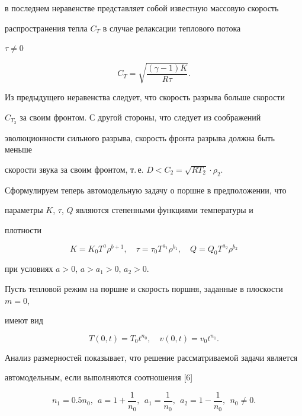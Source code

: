 в последнем неравенстве представляет собой известную массовую скорость


распространения тепла $C_T$ в случае релаксации теплового потока


$\tau\ne0$


$$


C_T=\sqrt{\frac{(\gamma-1)K}{R\tau}}.


$$


Из предыдущего неравенства следует, что скорость разрыва больше скорости


$C_{T_2}$ за своим фронтом. С другой стороны, что следует из соображений


эволюционности сильного разрыва, скорость фронта разрыва должна быть меньше


скорости звука за своим фронтом, т.\,е. $D<C_2=\sqrt{RT_2}\cdot\rho_2$.





Сформулируем теперь автомодельную задачу о поршне в предположении, что


параметры $K$, $\tau$, $Q$ являются степенными функциями температуры и


плотности


$$


K=K_0T^a\rho^{b+1},\quad


\tau=\tau_0T^{a_1}\rho^{b_1},\quad Q=Q_0T^{a_2}\rho^{b_2}


$$


при условиях $a>0$, $a>a_1>0$, $a_2>0$.





Пусть тепловой режим на поршне и скорость поршня, заданные в плоскости $m=0$,


имеют вид


\begin{equation}\label{eq32}


T(0,t)=T_0t^{n_0},\quad v(0,t)=v_0t^{n_1}.


\end{equation}


Анализ размерностей показывает, что решение рассматриваемой задачи является


автомодельным, если выполняются соотношения [6]


\begin{equation}\label{eq33}


n_1=0.5n_0,\ \ a=1+\frac{1}{n_0},\ \ a_1=\frac{1}{n_0},


\ \ a_2=1-\frac{1}{n_0},\ \ n_0\ne0.


\end{equation}


